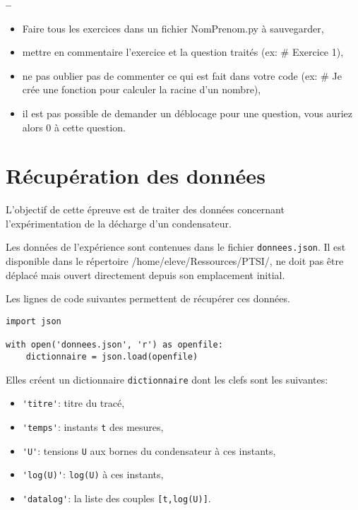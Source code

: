 

\begin{center}
{\Large\bf {\type} \no {\numero} -- \descrip}
\end{center}


\begin{boxedminipage}{.9\textwidth} 
\begin{itemize}
 \item Faire tous les exercices dans un fichier {NomPrenom.py} à sauvegarder,
 \item mettre en commentaire l'exercice et la question traités (ex: \# Exercice 1),
 \item ne pas oublier pas de commenter ce qui est fait dans votre code (ex: \# Je crée une fonction pour calculer la racine d'un nombre),
 \item il est pas possible de demander un déblocage pour une question, vous auriez alors 0 à cette question.
\end{itemize}
\end{boxedminipage}

\section{Récupération des données}

L'objectif de cette épreuve est de traiter des données concernant l'expérimentation de la décharge d'un condensateur.

Les données de l'expérience sont contenues dans le fichier \verb?donnees.json?.
Il est disponible dans le répertoire \og/home/eleve/Ressources/PTSI/\fg, ne doit pas être déplacé mais ouvert directement depuis son emplacement initial.

Les lignes de code suivantes permettent de récupérer ces données.
\begin{verbatim}
import json

with open('donnees.json', 'r') as openfile:
    dictionnaire = json.load(openfile)
\end{verbatim}

Elles créent un dictionnaire \verb?dictionnaire? dont les clefs sont les suivantes:
\begin{itemize}
 \item \verb?'titre'?: titre du tracé,
 \item \verb?'temps'?: instants \verb?t? des mesures,
 \item \verb?'U'?: tensions \verb?U? aux bornes du condensateur à ces instants,
 \item \verb?'log(U)'?: \verb?log(U)? à ces instants,
 \item \verb?'datalog'?: la liste des couples \verb?[t,log(U)]?.
\end{itemize}

